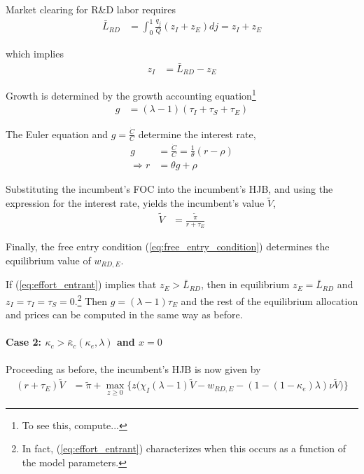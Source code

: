 \documentclass[11pt,english]{article}
\theoremstyle{remark}
\begin{document}
Market clearing for R\&D labor requires
\begin{align}
	\bar{L}_{RD} &= \int_0^1 \frac{q_j}{Q} (z_{I} + z_{E}) dj = z_I + z_E
\end{align}
 
which implies
\begin{align}
	z_I &= \bar{L}_{RD} - z_E \label{eq:zI_asFuncZe}
\end{align}

Growth is determined by the growth accounting equation\footnote{To see this, compute...}
\begin{align}
g &= (\lambda - 1)(\tau_I + \tau_S + \tau_E) \label{eq:growth_accounting}
\end{align}

The Euler equation and $g = \frac{\dot{C}}{C}$ determine the interest rate, 
\begin{align}
	g &= \frac{\dot{C}}{C} = \frac{1}{\theta} (r - \rho) \label{eq:euler} \\
	\Rightarrow r &= \theta g + \rho \nonumber
\end{align}

Substituting the incumbent's FOC into the incumbent's HJB, and using the expression for the interest rate, yields the incumbent's value $\tilde{V}$,
\begin{align}
	 \tilde{V} &= \frac{\tilde{\pi}}{r + \tau_E}
\end{align}

Finally, the free entry condition (\ref{eq:free_entry_condition}) determines the equilibrium value of $w_{RD,E}$.

If (\ref{eq:effort_entrant}) implies that $z_E > \bar{L}_{RD}$, then in equilibrium $z_E = \bar{L}_{RD}$ and $z_I = \tau_I = \tau_S = 0$.\footnote{In fact, (\ref{eq:effort_entrant}) characterizes when this occurs as a function of the model parameters.} Then $g = (\lambda - 1) \tau_E$ and the rest of the equilibrium allocation and prices can be computed in the same way as before. 

\paragraph{Case 2: $\kappa_c > \bar{\kappa}_c(\kappa_e,\lambda)$ and $x = 0$}
Proceeding as before, the incumbent's HJB is now given by 
\begin{align}
	(r + \tau_E) \tilde{V} &= \tilde{\pi} + \max_{z \ge 0 } \Big\{ z \Big( \chi_I (\lambda - 1) \tilde{V} - w_{RD,E} - (1 - (1-\kappa_e)\lambda) \nu \tilde{V} \Big)  \Big\}\label{eq:hjb_incumbent_noNCA}
\end{align}
\end{document}

